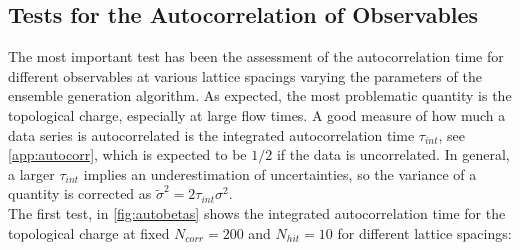 \subsection{Tests for the Autocorrelation of Observables}
\label{sec:obs_autocorr}
The most important test has been the assessment of the autocorrelation time for different observables at various lattice spacings varying the parameters of the ensemble generation algorithm. As expected, the most problematic quantity is the topological charge, especially at large flow times. A good measure of how much a data series is autocorrelated is the integrated autocorrelation time $\tau_{int}$, see \cref{app:autocorr}, which is expected to be $1/2$ if the data is uncorrelated. In general, a larger $\tau_{int}$ implies an underestimation of uncertainties, so the variance of a quantity is corrected as $\tilde\sigma^2 = 2\tau_{int}\sigma^2$. \\
The first test, in \cref{fig:autobetas} shows the integrated autocorrelation time for the topological charge at fixed $N_{corr}=200$ and $N_{hit} = 10$ for different lattice spacings:

